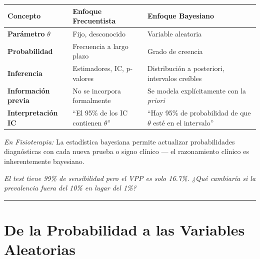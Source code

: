 \documentclass[
  letterpaper,
  DIV=11,
  numbers=noendperiod]{scrartcl}
\newcounter{none} %
\begin{document}
{\def\LTcaptype{none} %
\begin{longtable}[]{@{}
  >{\raggedright\arraybackslash}p{}
  >{\raggedright\arraybackslash}p{}
  >{\raggedright\arraybackslash}p{}@{}}
\toprule\noalign{}
\begin{minipage}[b]{\linewidth}\raggedright
Concepto
\end{minipage} & \begin{minipage}[b]{\linewidth}\raggedright
Enfoque Frecuentista
\end{minipage} & \begin{minipage}[b]{\linewidth}\raggedright
Enfoque Bayesiano
\end{minipage} \\
\midrule\noalign{}
\endhead
\bottomrule\noalign{}
\endlastfoot
\textbf{Parámetro} \(\theta\) & Fijo, desconocido & Variable
aleatoria \\
\textbf{Probabilidad} & Frecuencia a largo plazo & Grado de creencia \\
\textbf{Inferencia} & Estimadores, IC, p-valores & Distribución a
posteriori, intervalos creíbles \\
\textbf{Información previa} & No se incorpora formalmente & Se modela
explícitamente con la \emph{priori} \\
\textbf{Interpretación IC} & ``El 95\% de los IC contienen \(\theta\)''
& ``Hay 95\% de probabilidad de que \(\theta\) esté en el intervalo'' \\
\end{longtable}
}

\emph{En Fisioterapia:} La estadística bayesiana permite actualizar
probabilidades diagnósticas con cada nueva prueba o signo clínico --- el
razonamiento clínico es inherentemente bayesiano.

\emph{El test tiene 99\% de sensibilidad pero el VPP es solo 16.7\%.
¿Qué cambiaría si la prevalencia fuera del 10\% en lugar del 1\%?}

\begin{center}\rule{0.5\linewidth}{0.5pt}\end{center}

\section{De la Probabilidad a las Variables
Aleatorias}\label{de-la-probabilidad-a-las-variables-aleatorias}
\end{document}
